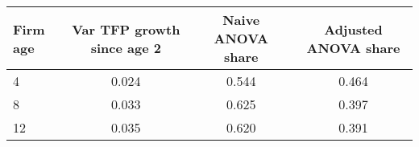 \begin{tabular}{lccc}
Firm age & Var TFP growth since age 2 & Naive ANOVA share & Adjusted ANOVA share \\
\hline
4 &     0.024 &  0.544 &  0.464 \\
8 &     0.033 &  0.625 &  0.397 \\
12 &     0.035 &  0.620 &  0.391 \\
\end{tabular}
